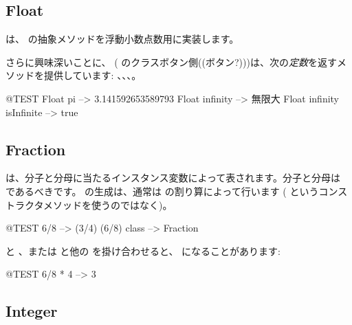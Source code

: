 \documentclass[a4paper,10pt,twoside]{book}
\begin{document}

\subsection{Float}

 は、 の抽象メソッドを浮動小数点数用に実装します。

さらに興味深いことに、 (\ie{} のクラスボタン側((ボタン?)))は、次の\emph{定数}を返すメソッドを提供しています: 、、、。

\begin{code}{@TEST}
Float pi                      --> 3.141592653589793
Float infinity               --> 無限大
Float infinity isInfinite --> true
\end{code}

\subsection{Fraction}

 は、分子と分母に当たるインスタンス変数によって表されます。分子と分母は  であるべきです。 の生成は、通常は  の割り算によって行います ( というコンストラクタメソッドを使うのではなく)。

\begin{code}{@TEST}
6/8             --> (3/4)
(6/8) class --> Fraction
\end{code}

 と 、または  と他の  を掛け合わせると、 になることがあります:

\begin{code}{@TEST}
6/8 * 4 --> 3
\end{code}


\subsection{Integer}
\end{document}
